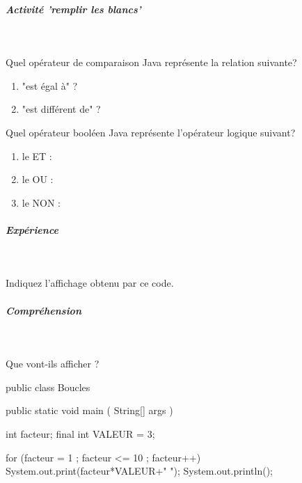 \documentclass[11pt,a4paper]{article}
\begin{document}
			
		\subparagraph{Activit\'e 'remplir les blancs'} 
		
                \textcolor{white}{.} \par
            
								Quel op\'erateur de comparaison Java repr\'esente la relation suivante? 
							
            \par
        
					\begin{enumerate}
				
			\item "est \'egal \`a" ?                      \textcolor{gray}{\underline{\hspace*{2em}}} 
			\item "est diff\'erent de" ?                \textcolor{gray}{\underline{\hspace*{2em}}} 
					\end{enumerate}
				
								Quel op\'erateur bool\'een Java repr\'esente l'op\'erateur logique suivant? 
							
            \par
        
					\begin{enumerate}
				
			\item le ET :   \textcolor{gray}{\underline{\hspace*{2em}}} 
			\item le OU :   \textcolor{gray}{\underline{\hspace*{2em}}} 
			\item le NON :  \textcolor{gray}{\underline{\hspace*{1em}}} 
					\end{enumerate}
				
			
		\subparagraph{Exp\'erience} 
		
					\textcolor{white}{.} \par
				
					Indiquez l'affichage obtenu par ce code.
				
            \par
        
			
		\subparagraph{Compr\'ehension} 
		
                \textcolor{white}{.} \par
            
							  Que vont-ils afficher ?
              \begin{Java}
public class Boucles {

	public static void main ( String[] args ) {
		int facteur;
		final int VALEUR = 3;
	
		for (facteur = 1 ; facteur <= 10 ; facteur++){		
			System.out.print(facteur*VALEUR+" ");
		}
		System.out.println();
	}
}			\end{Java} \textcolor{gray}{\underline{\hspace*{16em}}} 
			
\end{document}
